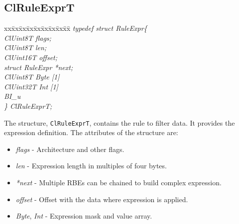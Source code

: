 \begin{flushleft}
\subsection{ClRuleExprT}
\begin{tabbing}
xx\=xx\=xx\=xx\=xx\=xx\=xx\=xx\=xx\=\kill
\textit{typedef struct RuleExpr\{}\\
\>\>\>\>\textit{ClUint8T flags;}\\
\>\>\>\>\textit{ClUint8T len;}\\
\>\>\>\>\textit{ClUint16T offset;}\\
\>\>\>\>\textit{struct RuleExpr *next;}\\
\>\>\>\>\>\>\textit{ClUint8T Byte \mbox{[}1\mbox{]}}\\
\>\>\>\>\>\>\textit{ClUint32T Int \mbox{[}1\mbox{]}}\\
\>\>\>\>\textit{BI\_u}\\
\textit{\} ClRuleExprT;}\end{tabbing}
The structure, {\tt{ClRuleExprT}}, contains the rule to filter data. It provides the expression definition. The attributes of the structure are:
\begin{itemize}
\item
\textit{flags} - Architecture and other flags.
\item 
\textit{len} - Expression length in multiples of four bytes.
\item 
\textit{*next} - Multiple RBEs can be chained to build complex expression.
\item 
\textit{ offset} - Offset with the data where expression is applied.
\item
\textit{Byte}, \textit{Int} - Expression mask and value array.
\end{itemize}



\end{flushleft}
